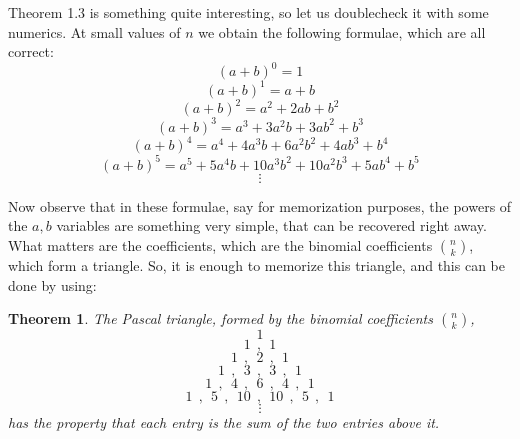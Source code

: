 \documentclass[12pt]{amsbook}
\newtheorem{theorem}{Theorem}[chapter]
\begin{document}
Theorem 1.3 is something quite interesting, so let us doublecheck it with some numerics. At small values of $n$ we obtain the following formulae, which are all correct:
$$(a+b)^0=1$$
$$(a+b)^1=a+b$$
$$(a+b)^2=a^2+2ab+b^2$$
$$(a+b)^3=a^3+3a^2b+3ab^2+b^3$$
$$(a+b)^4=a^4+4a^3b+6a^2b^2+4ab^3+b^4$$
$$(a+b)^5=a^5+5a^4b+10a^3b^2+10a^2b^3+5ab^4+b^5$$
$$\vdots$$

Now observe that in these formulae, say for memorization purposes, the powers of the $a,b$ variables are something very simple, that can be recovered right away. What matters are the coefficients, which are the binomial coefficients $\binom{n}{k}$, which form a triangle. So, it is enough to memorize this triangle, and this can be done by using:


\begin{theorem}
The Pascal triangle, formed by the binomial coefficients $\binom{n}{k}$,
$$1$$
$$1\ \ ,\ \ 1$$
$$1\ \ ,\ \ 2\ \ ,\ \ 1$$
$$1\ \ ,\ \ 3\ \ ,\ \ 3\ \ ,\ \ 1$$
$$1\ \ ,\ \ 4\ \ ,\ \ 6\ \ ,\ \ 4\ \ ,\ \ 1$$
$$1\ \ ,\ \ 5\ \ ,\ \ 10\ \ ,\ \ 10\ \ ,\ \ 5\ \ ,\ \ 1$$
$$\vdots$$
has the property that each entry is the sum of the two entries above it.
\end{theorem}
\end{document}
